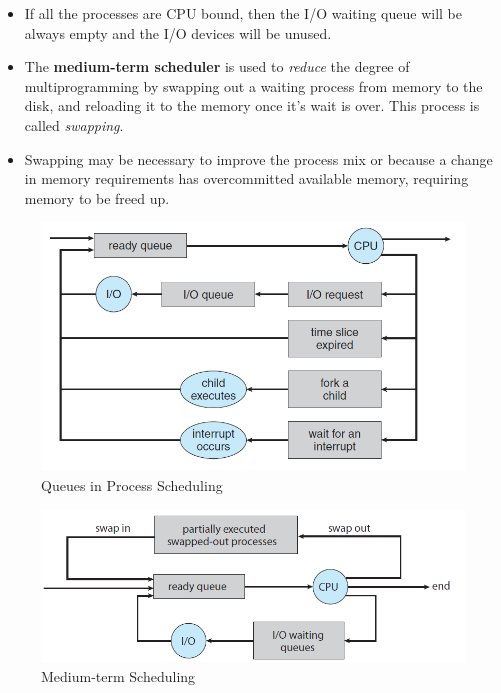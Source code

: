 \documentclass{article}
\theoremstyle{plain}
\theoremstyle{definition}
\begin{document}
\begin{itemize}
    \item If all the processes are CPU bound, then the I/O waiting queue will be always empty and the I/O devices will be unused. 
    
    \item The \textbf{medium-term scheduler} is used to \textit{reduce} the degree of multiprogramming by swapping out a waiting process from memory to the disk, and reloading it to the memory once it's wait is over. This process is called \textit{swapping}.
    
    \item Swapping may be necessary to improve the process mix or because
a change in memory requirements has overcommitted available memory,
requiring memory to be freed up.
\end{itemize}

\begin{figure}[ht]
    \centering
    \includegraphics[scale=0.7]{os16.png}
    \caption{Queues in Process Scheduling}
    \label{fig:my_label_yy}
\end{figure}

\begin{figure}
    \centering
    \includegraphics[scale=0.6]{os17.png}
    \caption{Medium-term Scheduling}
    \label{fig:my_label_yyx}
\end{figure}
\end{document}
